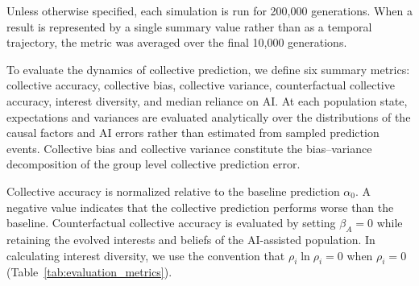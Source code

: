\documentclass[12pt]{article}
\begin{document}
Unless otherwise specified, each simulation is run for 200,000 generations. 
When a result is represented by a single summary value rather than as a temporal trajectory, the metric was averaged over the final 10,000 generations.

To evaluate the dynamics of collective prediction, we define six summary metrics: collective accuracy, collective bias, collective variance, counterfactual collective accuracy, interest diversity, and median reliance on AI. 
At each population state, expectations and variances are evaluated analytically over the distributions of the causal factors and AI errors rather than estimated from sampled prediction events.
Collective bias and collective variance constitute the bias--variance decomposition of the group level collective prediction error.

Collective accuracy is normalized relative to the baseline prediction $\alpha_0$. 
A negative value indicates that the collective prediction performs worse than the baseline. 
Counterfactual collective accuracy is evaluated by setting $\beta_A=0$ while retaining the evolved interests and beliefs of the AI-assisted population. 
In calculating interest diversity, we use the convention that $\rho_i\ln\rho_i=0$ when $\rho_i=0$ (Table~\ref{tab:evaluation_metrics}).
\end{document}
